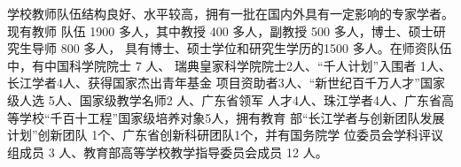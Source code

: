 学校教师队伍结构良好、水平较高，拥有一批在国内外具有一定影响的专家学者。现有教师
队伍 1900 多人，其中教授 400 多人，副教授 500 多人，博士、硕士研究生导师 800 多人，
具有博士、硕士学位和研究生学历的1500 多人。在师资队伍中，有中国科学院院士 7 人、
瑞典皇家科学院院士2人、“千人计划”入围者 1人、长江学者4人、获得国家杰出青年基金
项目资助者3人、“新世纪百千万人才”国家级人选 5人、国家级教学名师2 人、广东省领军
人才4人、珠江学者4人、广东省高等学校“千百十工程”国家级培养对象5人，拥有教育
部“长江学者与创新团队发展计划”创新团队 1个、广东省创新科研团队1个，并有国务院学
位委员会学科评议组成员 3 人、教育部高等学校教学指导委员会成员 12 人。

\begin{table}[htbp]
\centering
\caption{并排子表格}
\label{tab:subtable}
\hskip2cm
\end{table}

